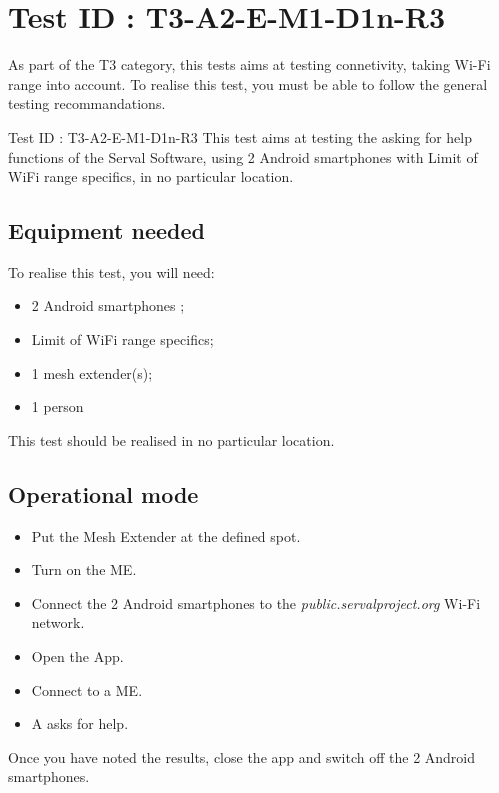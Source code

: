 \documentclass[oneside]{book}
\begin{document}
\section{Test ID : T3-A2-E-M1-D1n-R3}
\begin{itshape}
As part of the T3 category, this tests aims at testing connetivity, taking Wi-Fi range into account.
To realise this test, you must be able to follow the general testing recommandations.
\end{itshape}
\newline
Test ID : T3-A2-E-M1-D1n-R3
 This test aims at testing the asking for help functions of the Serval Software, using 2 Android smartphones with Limit of WiFi range specifics, in no particular location.
\subsection{Equipment needed} To realise this test, you will need:
\begin{itemize}
\item 2 Android smartphones ;
\item Limit of WiFi range specifics;
\item 1 mesh extender(s);
\item 1 person
\end{itemize}
This test should be realised in no particular location.
\subsection{Operational mode} \begin{itemize}
\item Put the Mesh Extender at the defined spot.
\item Turn on the ME.
\item Connect the 2 Android smartphones to the \emph{public.servalproject.org} Wi-Fi network.
\item Open the App.
\item Connect to a ME.
\item A asks for help.
\end{itemize}
Once you have noted the results, close the app and switch off the 2 Android smartphones.
\end{document}
